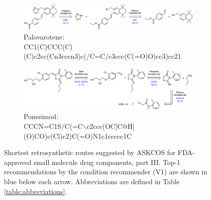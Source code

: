\documentclass[pdflatex,sn-mathphys-num]{sn-jnl}%
\theoremstyle{thmstyleone}%
\theoremstyle{thmstyletwo}%
\theoremstyle{thmstylethree}%
\begin{document}
\begin{figure}[h!]
    \captionsetup[subfigure]{labelformat=empty}
    \begin{subfigure}[t]{1.0\textwidth}
        \includegraphics[scale=0.725]{media/SI_study/8.palovarotene.png}
        \caption{Palovarotene: \\ \small CC1(C)CCC(C)(C)c2cc(Cn3cccn3)c(/C=C/c3ccc(C(=O)O)cc3)cc21}
    \end{subfigure}
    \hfill
    \vspace{1cm}
    \begin{subfigure}[t]{1.0\textwidth}
        \includegraphics[scale=0.725]{media/SI_study/10.ponesimod.png}
        \caption{Ponesimod: \\ \small CCCN=C1S/C(=C$\backslash$c2ccc(OC[C@H](O)CO)c(Cl)c2)C(=O)N1c1ccccc1C}
    \end{subfigure}
    \hfill
    \caption{Shortest retrosynthetic routes suggested by ASKCOS for FDA-approved small molecule drug components, part III. Top-1 recommendations by the condition recommender (V1) are shown in blue below each arrow. Abbreviations are defined in Table \ref{table:abbreviations}.}
    \label{fig:fda_study_3}
\end{figure}
\end{document}
